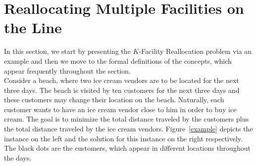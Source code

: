 \section{Reallocating Multiple Facilities on the 
Line}
\label{sec:facility_loc}

\noindent 
In this section, we start by presenting the $K$-Facility Reallocation problem \cite{FOTAKIS202113} via an example and then we move to the formal definitions of the concepts, which  appear frequently throughout the section. \\

Consider a beach, where two ice cream vendors are to be located for the next three days. The beach is visited by ten customers for the next three days and these customers may change their location on the beach. Naturally, each customer wants to have an ice cream vendor close to him in order to buy ice cream. The goal is to minimize the total distance traveled by the customers plus the total distance traveled by the ice cream vendors.  Figure~\ref{example} depicts the instance on the left and the solution for this instance on the right  respectively. The black dots are the customers, which appear in different locations throughout the days. \\


